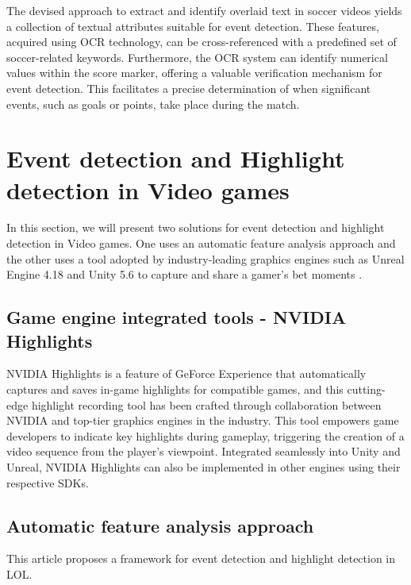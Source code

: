     The devised approach to extract and identify overlaid text in soccer videos yields a collection of textual attributes suitable for event detection. These features, acquired using \gls{OCR} technology, can be cross-referenced with a predefined set of soccer-related keywords. Furthermore, the \gls{OCR} system can identify numerical values within the score marker, offering a valuable verification mechanism for event detection. This facilitates a precise determination of when significant events, such as goals or points, take place during the match.

\section{Event detection and Highlight detection in Video games}
\label{sec:EventDetctionVideogames}

    In this section, we will present two solutions for event detection and highlight detection in Video games. One uses an automatic feature analysis approach \cite{BroadcatedGames_analysis_LOL} and the other uses a tool adopted by industry-leading graphics engines such as  Unreal Engine 4.18 and Unity 5.6 to capture and share a gamer's bet moments \cite{NVIDIA_GeForce}.  

\subsection*{Game engine integrated tools - NVIDIA Highlights}
    
    NVIDIA Highlights is a feature of GeForce Experience \cite{NVIDIA_GeForce} that automatically captures and saves in-game highlights for compatible games, and this cutting-edge highlight recording tool has been crafted through collaboration between NVIDIA and top-tier graphics engines in the industry. This tool empowers game developers to indicate key highlights during gameplay, triggering the creation of a video sequence from the player's viewpoint. Integrated seamlessly into Unity and Unreal, NVIDIA Highlights can also be implemented in other engines using their respective SDKs.

\subsection*{Automatic feature analysis approach}

    This article \cite{BroadcatedGames_analysis_LOL} proposes a framework for event detection and highlight detection in \gls{LOL}. 
    
